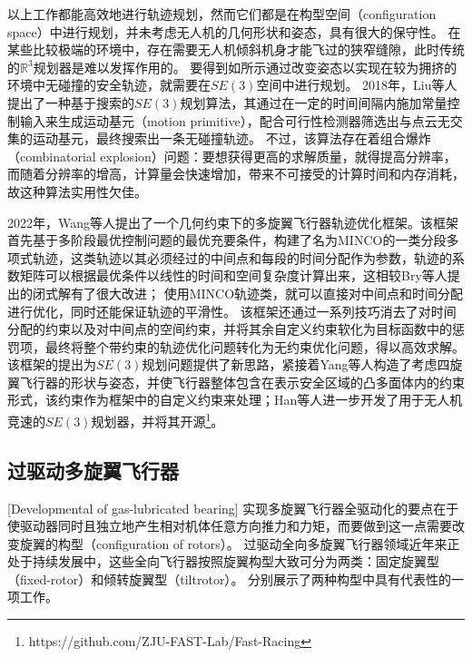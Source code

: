 以上工作都能高效地进行轨迹规划，然而它们都是在构型空间（configuration space）中进行规划，并未考虑无人机的几何形状和姿态，具有很大的保守性。
在某些比较极端的环境中，存在需要无人机倾斜机身才能飞过的狭窄缝隙，此时传统的$\mathbb{R}^3$规划器是难以发挥作用的。
要得到如所示通过改变姿态以实现在较为拥挤的环境中无碰撞的安全轨迹，就需要在$SE(3)$空间中进行规划。
2018年，Liu等人提出了一种基于搜索的$SE(3)$规划算法\cite{liu2018search}，其通过在一定的时间间隔内施加常量控制输入来生成运动基元（motion primitive），配合可行性检测器筛选出与点云无交集的运动基元，最终搜索出一条无碰撞轨迹。
不过，该算法存在着组合爆炸（combinatorial explosion）问题：要想获得更高的求解质量，就得提高分辨率，而随着分辨率的增高，计算量会快速增加，带来不可接受的计算时间和内存消耗，故这种算法实用性欠佳。

2022年，Wang等人提出了一个几何约束下的多旋翼飞行器轨迹优化框架\cite{wang2022geometrically}。该框架首先基于多阶段最优控制问题的最优充要条件，构建了名为MINCO的一类分段多项式轨迹，这类轨迹以其必须经过的中间点和每段的时间分配作为参数，轨迹的系数矩阵可以根据最优条件以线性的时间和空间复杂度计算出来，这相较Bry等人提出的闭式解\cite{bry2015aggressive}有了很大改进；
使用MINCO轨迹类，就可以直接对中间点和时间分配进行优化，同时还能保证轨迹的平滑性。
该框架还通过一系列技巧消去了对时间分配的约束以及对中间点的空间约束，并将其余自定义约束软化为目标函数中的惩罚项，最终将整个带约束的轨迹优化问题转化为无约束优化问题，得以高效求解。
该框架的提出为$SE(3)$规划问题提供了新思路，紧接着Yang等人构造了考虑四旋翼飞行器的形状与姿态，并使飞行器整体包含在表示安全区域的凸多面体内的约束形式\cite{yang2021whole}，该约束作为框架中的自定义约束来处理；Han等人进一步开发了用于无人机竞速的$SE(3)$规划器\cite{2021Fast}，并将其开源\footnote{https://github.com/ZJU-FAST-Lab/Fast-Racing}。


\subsection{过驱动多旋翼飞行器}[Developmental of gas-lubricated bearing]
实现多旋翼飞行器全驱动化的要点在于使驱动器同时且独立地产生相对机体任意方向推力和力矩，而要做到这一点需要改变旋翼的构型（configuration of rotors）。
过驱动全向多旋翼飞行器领域近年来正处于持续发展中，这些全向飞行器按照旋翼构型大致可分为两类：固定旋翼型（fixed-rotor）\cite{brescianini2016design, park2018odar,allenspach2020design}和倾转旋翼型（tiltrotor）\cite{ryll2014novel, kamel2018voliro,2021Geometrically}。
分别展示了两种构型中具有代表性的一项工作。

